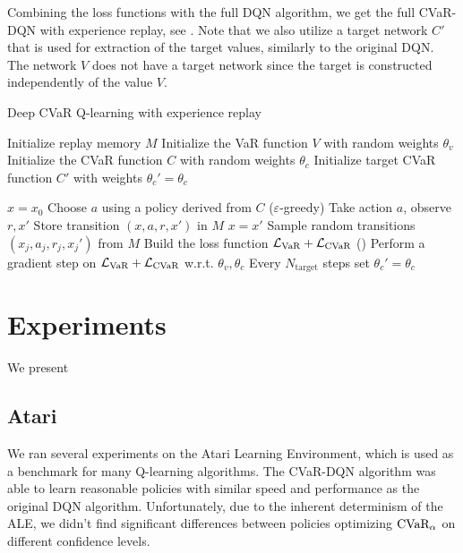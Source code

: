 Combining the loss functions with the full DQN algorithm, we get the full CVaR-DQN with experience replay, see . Note that we also utilize a target network $C'$ that is used for extraction of the target values, similarly to the original DQN. The network $V$ does not have a target network since the target is constructed independently of the value $V$.
\begin{algorithm}
\caption{Deep CVaR Q-learning with experience replay}
\begin{algorithmic}\label{alg:cvardqn}

    \STATE Initialize replay memory $M$
    \STATE Initialize the VaR function $V$ with random weights $\theta_v$
    \STATE Initialize the CVaR function $C$ with random weights $\theta_c$
    \STATE Initialize target CVaR function $C'$ with weights $\theta_c'=\theta_c$

    \STATE $x=x_0$
	\STATE Choose $a$ using a policy derived from $C$ ($\varepsilon$-greedy)
	\STATE Take action $a$, observe $r, x'$
	\STATE Store transition $(x, a, r, x')$ in $M$
	\STATE $x = x'$
	\STATE Sample random transitions $(x_j, a_j, r_j, x_j')$ from $M$
	\STATE Build the loss function $\mathcal{L}_{\text{VaR}} + \mathcal{L}_{\text{CVaR}}$ ()
    \STATE Perform a gradient step on $\mathcal{L}_{\text{VaR}} + \mathcal{L}_{\text{CVaR}}$ w.r.t. $\theta_v, \theta_c$
    \STATE Every $N_\text{target}$ steps set $\theta_c'=\theta_c$
	\ENDWHILE
	\ENDFOR
	
\end{algorithmic}
\end{algorithm}



\section{Experiments}
We present 

\subsection{Atari}
We ran several experiments on the Atari Learning Environment, which is used as a benchmark for many Q-learning algorithms. The CVaR-DQN algorithm was able to learn reasonable policies with similar speed and performance as the original DQN algorithm. Unfortunately, due to the inherent determinism of the ALE, we didn't find significant differences between policies optimizing $\text{CVaR}_\alpha$ on different confidence levels.

